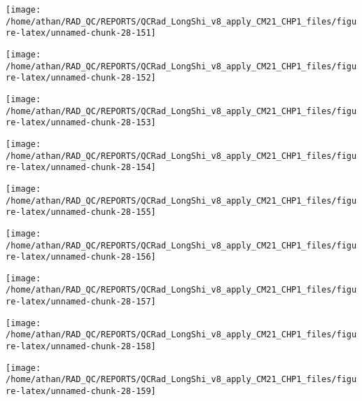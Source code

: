 \documentclass[
  10pt,
  a4paper,oneside]{article}
\begin{document}
\begin{center}\texttt{[image: /home/athan/RAD\_QC/REPORTS/QCRad\_LongShi\_v8\_apply\_CM21\_CHP1\_files/figure-latex/unnamed-chunk-28-151]} \end{center}

\begin{center}\texttt{[image: /home/athan/RAD\_QC/REPORTS/QCRad\_LongShi\_v8\_apply\_CM21\_CHP1\_files/figure-latex/unnamed-chunk-28-152]} \end{center}

\begin{center}\texttt{[image: /home/athan/RAD\_QC/REPORTS/QCRad\_LongShi\_v8\_apply\_CM21\_CHP1\_files/figure-latex/unnamed-chunk-28-153]} \end{center}

\begin{center}\texttt{[image: /home/athan/RAD\_QC/REPORTS/QCRad\_LongShi\_v8\_apply\_CM21\_CHP1\_files/figure-latex/unnamed-chunk-28-154]} \end{center}

\begin{center}\texttt{[image: /home/athan/RAD\_QC/REPORTS/QCRad\_LongShi\_v8\_apply\_CM21\_CHP1\_files/figure-latex/unnamed-chunk-28-155]} \end{center}

\begin{center}\texttt{[image: /home/athan/RAD\_QC/REPORTS/QCRad\_LongShi\_v8\_apply\_CM21\_CHP1\_files/figure-latex/unnamed-chunk-28-156]} \end{center}

\begin{center}\texttt{[image: /home/athan/RAD\_QC/REPORTS/QCRad\_LongShi\_v8\_apply\_CM21\_CHP1\_files/figure-latex/unnamed-chunk-28-157]} \end{center}

\begin{center}\texttt{[image: /home/athan/RAD\_QC/REPORTS/QCRad\_LongShi\_v8\_apply\_CM21\_CHP1\_files/figure-latex/unnamed-chunk-28-158]} \end{center}

\begin{center}\texttt{[image: /home/athan/RAD\_QC/REPORTS/QCRad\_LongShi\_v8\_apply\_CM21\_CHP1\_files/figure-latex/unnamed-chunk-28-159]} \end{center}
\end{document}
